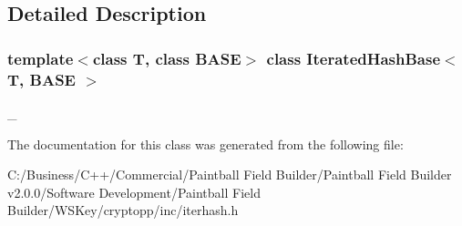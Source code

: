 \subsection{Detailed Description}
\subsubsection*{template$<$class T, class BASE$>$ class IteratedHashBase$<$ T, BASE $>$}

\_\- 

The documentation for this class was generated from the following file:\begin{DoxyCompactItemize}
\item 
C:/Business/C++/Commercial/Paintball Field Builder/Paintball Field Builder v2.0.0/Software Development/Paintball Field Builder/WSKey/cryptopp/inc/iterhash.h\end{DoxyCompactItemize}
